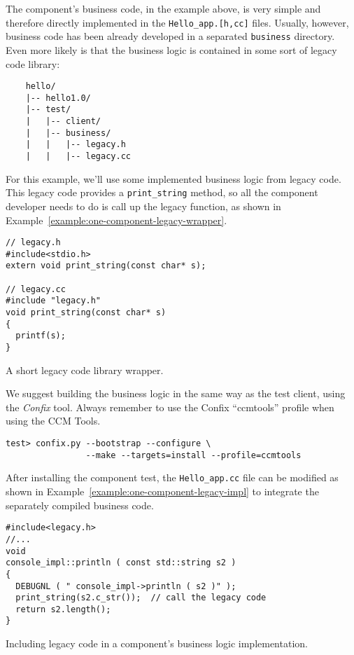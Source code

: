 The component's business code, in the example above, is very simple and
therefore directly implemented in the {\tt Hello\_app.[h,cc]} files. Usually,
however, business code has been already developed in a separated {\tt business}
directory. Even more likely is that the business logic is contained in some sort
of legacy code library:
\begin{small}
\begin{verbatim}
    hello/
    |-- hello1.0/
    |-- test/
    |   |-- client/
    |   |-- business/
    |   |   |-- legacy.h
    |   |   |-- legacy.cc
\end{verbatim}
\end{small}

For this example, we'll use some implemented business logic from legacy code.
This legacy code provides a {\tt print\_string} method, so all the component
developer needs to do is call up the legacy function, as shown in
Example~\ref{example:one-component-legacy-wrapper}.

\begin{Example}
\begin{minifbox}
\begin{small}
\begin{verbatim}
// legacy.h
#include<stdio.h>
extern void print_string(const char* s);

// legacy.cc
#include "legacy.h"
void print_string(const char* s)
{
  printf(s);
}
\end{verbatim}
\end{small}
\end{minifbox}
\caption{A short legacy code library wrapper.}
\label{example:one-component-legacy-wrapper}
\end{Example}

We suggest building the business logic in the same way as the test client, using
the {\it Confix} tool. Always remember to use the Confix ``ccmtools'' profile
when using the CCM Tools.
\begin{small}
\begin{verbatim}
test> confix.py --bootstrap --configure \
                --make --targets=install --profile=ccmtools
\end{verbatim}
\end{small}

After installing the component test, the {\tt Hello\_app.cc} file can be
modified as shown in Example~\ref{example:one-component-legacy-impl} to
integrate the separately compiled business code.

\begin{Example}
\begin{minifbox}
\begin{small}
\begin{verbatim}
#include<legacy.h>
//...
void
console_impl::println ( const std::string s2 )
{
  DEBUGNL ( " console_impl->println ( s2 )" );
  print_string(s2.c_str());  // call the legacy code
  return s2.length();
}
\end{verbatim}
\end{small}
\end{minifbox}
\caption{Including legacy code in a component's business logic implementation.}
\label{example:one-component-legacy-impl}
\end{Example}

